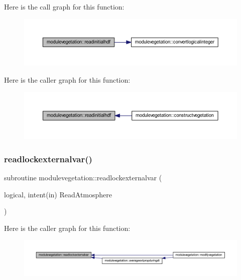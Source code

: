 Here is the call graph for this function\+:\nopagebreak
\begin{figure}[H]
\begin{center}
\leavevmode
\includegraphics[width=350pt]{namespacemodulevegetation_ae02d565fa46c0234360e5a9da0983414_cgraph}
\end{center}
\end{figure}
Here is the caller graph for this function\+:\nopagebreak
\begin{figure}[H]
\begin{center}
\leavevmode
\includegraphics[width=350pt]{namespacemodulevegetation_ae02d565fa46c0234360e5a9da0983414_icgraph}
\end{center}
\end{figure}
\mbox{\label{namespacemodulevegetation_a81039144c85fe53d59983283da9998a3}} 
\subsubsection{\texorpdfstring{readlockexternalvar()}{readlockexternalvar()}}
{\footnotesize\ttfamily subroutine modulevegetation\+::readlockexternalvar (\begin{DoxyParamCaption}\item[{logical, intent(in)}]{Read\+Atmosphere }\end{DoxyParamCaption})\hspace{0.3cm}{\ttfamily [private]}}

Here is the caller graph for this function\+:\nopagebreak
\begin{figure}[H]
\begin{center}
\leavevmode
\includegraphics[width=350pt]{namespacemodulevegetation_a81039144c85fe53d59983283da9998a3_icgraph}
\end{center}
\end{figure}
\mbox{\label{namespacemodulevegetation_a0a43607cdb2236530e5fb3fefa7498f1}} 
